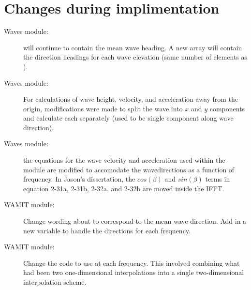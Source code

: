 %


\clearpage
\section{Changes during implimentation}
\begin{description}
   \item[Waves module:]{ will continue to contain the mean wave heading.  A new array  will contain the direction headings for each wave elevation (same number of elements as ).}
   \item[Waves module:]{For calculations of wave height, velocity, and acceleration away from the origin, modifications were made to split the wave into $x$ and $y$ components and calculate each separately (used to be single component along wave direction).}
   \item[Waves module:]{the equations for the wave velocity and acceleration used within the  module are modified to accomodate the wavedirections as a function of frequency.  In Jason's dissertation, the $cos(\beta)$ and $sin(\beta)$ terms in equation 2-31a, 2-31b, 2-32a, and 2-32b are moved inside the IFFT.}  %
   \item[WAMIT module:]{Change wording about  to correspond to the mean wave direction.  Add in a new variable  to handle the directions for each frequency.}
   \item[WAMIT module:]{Change the code to use  at each frequency.  This involved combining what had been two one-dimensional interpolations into a single two-dimensional interpolation scheme.}
\end{description}


